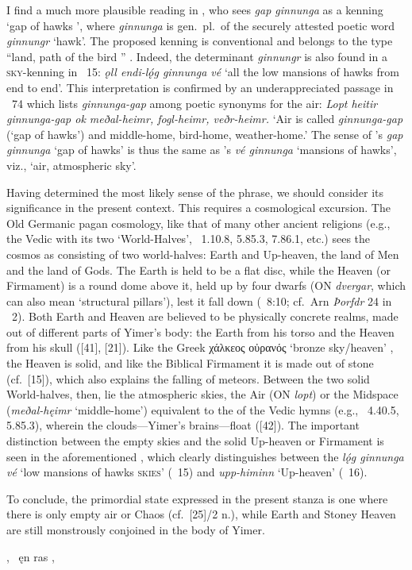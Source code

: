 {{I find a much more plausible reading in \citeauthor{Meissner1921}, who sees \emph{gap ginnunga} as a kenning ‘gap of hawks ’, where \emph{ginnunga} is gen.~pl.~of the securely attested poetic word \emph{ginnungr} ‘hawk’.
The proposed kenning is conventional and belongs to the type “land, path of the bird ” \parencite[108]{Meissner1921}.  Indeed, the determinant \emph{ginnungr} is also found in a \textsc{sky}-kenning in \Haustlong\ 15: \emph{ǫll endi-lǫ́g ginnunga vé} ‘all the low mansions of hawks  from end to end’.
This interpretation is confirmed by an underappreciated passage in \Skaldskaparmal\ 74 which lists \emph{ginnunga-gap} among poetic synonyms for the air: \emph{Lopt heitir ginnunga-gap ok meðal-heimr, fogl-heimr, veðr-heimr.} ‘Air is called \emph{ginnunga-gap} (‘gap of hawks’) and middle-home, bird-home, weather-home.’  The sense of \Voluspa’s \emph{gap ginnunga} ‘gap of hawks’ is thus the same as \Haustlong’s \emph{vé ginnunga} ‘mansions of hawks’, viz., ‘air, atmospheric sky’.

Having determined the most likely sense of the phrase, we should consider its significance in the present context.  This requires a cosmological excursion.
The Old Germanic pagan cosmology, like that of many other ancient religions (e.g., the Vedic with its two  ‘World-Halves’, \Rigveda\ 1.10.8, 5.85.3, 7.86.1, etc.) sees the cosmos as consisting of two world-halves: Earth and Up-heaven, the land of Men and the land of Gods.  The Earth is held to be a flat disc, while the Heaven (or Firmament) is a round dome above it, held up by four dwarfs (ON \emph{dvergar}, which can also mean ‘structural pillars’), lest it fall down (\Gylfaginning~8:10; cf.~Arn \emph{Þorfdr} 24 in \Skp\ 2).
Both Earth and Heaven are believed to be physically concrete realms, made out of different parts of Yimer’s body: the Earth from his torso and the Heaven from his skull ([41], [21]).  Like the Greek \textgreek{χάλκεος οὐρανός} ‘bronze sky/heaven’ \parencite{Pontani2011}, the Heaven is solid, and like the Biblical Firmament it is made out of stone (cf.~[15]), which also explains the falling of meteors.
Between the two solid World-halves, then, lie the atmospheric skies, the Air (ON \emph{lopt}) or the Midspace (\emph{meðal-hęimr} ‘middle-home’) equivalent to the  of the Vedic hymns (e.g., \Rigveda\ 4.40.5, 5.85.3), wherein the clouds---Yimer’s brains---float ([42]).  The important distinction between the empty skies and the solid Up-heaven or Firmament is seen in the aforementioned \Haustlong, which clearly distinguishes between the \emph{lǫ́g ginnunga vé} ‘low mansions of hawks \textsc{skies}’ (\Haustlong\ 15) and \emph{upp-himinn} ‘Up-heaven’ (\Haustlong\ 16).

To conclude, the primordial state expressed in the present stanza is one where there is only empty air or Chaos (cf.~[25]/2 n.), while Earth and Stoney Heaven are still monstrously conjoined in the body of Yimer.}}, \hld\ ęn ras ,\eva%


